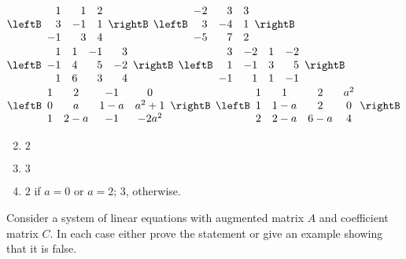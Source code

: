 \begin{multicols}{2}
\begin{ex}
\begin{exenumerate}
\exitem %
$\leftB \begin{array}{rrr}
	1 & 1 & 2 \\
	3 & -1 & 1 \\
	-1 & 3 & 4
\end{array} \rightB$
\exitem %
$\leftB \begin{array}{rrr}
	-2 & 3 & 3 \\
	3 & -4 & 1 \\
	-5 & 7 & 2
\end{array} \rightB$
\exitem %
$\leftB \begin{array}{rrrr}
	1 & 1 & -1 & 3 \\
	-1 & 4 & 5 & -2 \\
	1 & 6 & 3 & 4
\end{array} \rightB$
\exitem %
$\leftB \begin{array}{rrrr}
	3 & -2 & 1 & -2 \\
	1 & -1 & 3 & 5 \\
	-1 & 1 & 1 & -1
\end{array} \rightB$
\exitem* %
$\leftB \begin{array}{cccc}
	1 & 2 & -1 & 0 \\
	0 & a & 1 - a & a^2 + 1 \\
	1 & 2 - a & -1 & -2a^2
\end{array} \rightB$
\exitem* %
$\leftB \begin{array}{cccc}
	1 & 1 & 2 & a^2 \\
	1 & 1 - a & 2 & 0 \\
	2 & 2 - a & 6 - a & 4
\end{array} \rightB$
\end{exenumerate}
\begin{sol}
\begin{enumerate}[label={\alph*.}]
\setcounter{enumi}{1}
\item  $2$
\setcounter{enumi}{3}
\item  $3$
\setcounter{enumi}{5}
\item $2$ if $a = 0$ or $a = 2$; $3$, otherwise.
\end{enumerate}
\end{sol}
\end{ex}

\begin{ex}
Consider a system of linear equations with augmented matrix $A$ and coefficient matrix $C$. In each case either prove the statement or give an example showing that it is false.


\end{ex}
\end{multicols}
